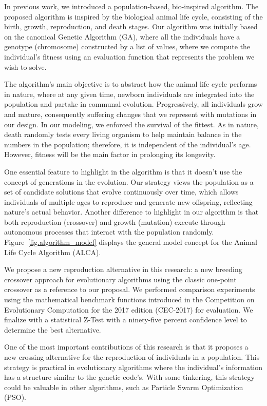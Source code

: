 \documentclass[graybox]{svmult}
\begin{document}
    In previous work, we introduced a population-based, bio-inspired algorithm\cite{Felix-Saul2022,Felix-Saul2023}. The proposed algorithm is inspired by the biological animal life cycle, consisting of the birth, growth, reproduction, and death stages\cite{read1968system}. Our algorithm was initially based on the canonical Genetic Algorithm (GA)\cite{holland1992genetic,holland1984genetic}, where all the individuals have a genotype (chromosome) constructed by a list of values, where we compute the individual's fitness using an evaluation function that represents the problem we wish to solve.
    
    The algorithm's main objective is to abstract how the animal life cycle performs in nature, where at any given time, newborn individuals are integrated into the population and partake in communal evolution. Progressively, all individuals grow and mature, consequently suffering changes that we represent with mutations in our design. In our modeling, we enforced the survival of the fittest. As in nature, death randomly tests every living organism to help maintain balance in the numbers in the population; therefore, it is independent of the individual's age. However, fitness will be the main factor in prolonging its longevity.

    One essential feature to highlight in the algorithm is that it doesn't use the concept of generations in the evolution. Our strategy views the population as a set of candidate solutions that evolve continuously over time, which allows individuals of multiple ages to reproduce and generate new offspring, reflecting nature's actual behavior. Another difference to highlight in our algorithm is that both reproduction (crossover) and growth (mutation) execute through autonomous processes that interact with the population randomly. Figure~\ref{fig.algorithm_model} displays the general model concept for the Animal Life Cycle Algorithm (ALCA)\cite{Felix-Saul2023}.

    We propose a new reproduction alternative in this research: a new breeding crossover approach for evolutionary algorithms using the classic one-point crossover as a reference to our proposal. We performed comparison experiments using the mathematical benchmark functions introduced in the Competition on Evolutionary Computation for the 2017 edition (CEC-2017) for evaluation. We finalize with a statistical Z-Test with a ninety-five percent confidence level to determine the best alternative.

    One of the most important contributions of this research is that it proposes a new crossing alternative for the reproduction of individuals in a population. This strategy is practical in evolutionary algorithms where the individual's information has a structure similar to the genetic code's. With some tinkering, this strategy could be valuable in other algorithms\cite{venter2003particle,wang2018particle}, such as Particle Swarm Optimization (PSO).
\end{document}
